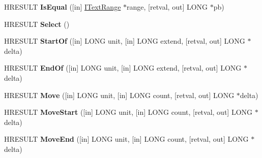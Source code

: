 \begin{DoxyCompactItemize}
\item 
\mbox{\label{interfacetom_1_1_i_text_range_a7f5cc02ca9bb296fd8d975bc23747808}} 
H\+R\+E\+S\+U\+LT {\bfseries Is\+Equal} (\mbox{[}in\mbox{]} \hyperlink{interfacetom_1_1_i_text_range}{I\+Text\+Range} $\ast$range, \mbox{[}retval, out\mbox{]} L\+O\+NG $\ast$pb)
\item 
\mbox{\label{interfacetom_1_1_i_text_range_a90cfe754f8611b5df1ead1839663bc9d}} 
H\+R\+E\+S\+U\+LT {\bfseries Select} ()
\item 
\mbox{\label{interfacetom_1_1_i_text_range_a60ae9696ffbcc0adf2b24377504314dc}} 
H\+R\+E\+S\+U\+LT {\bfseries Start\+Of} (\mbox{[}in\mbox{]} L\+O\+NG unit, \mbox{[}in\mbox{]} L\+O\+NG extend, \mbox{[}retval, out\mbox{]} L\+O\+NG $\ast$delta)
\item 
\mbox{\label{interfacetom_1_1_i_text_range_abeef363ffc7ae78aeec11357975a249b}} 
H\+R\+E\+S\+U\+LT {\bfseries End\+Of} (\mbox{[}in\mbox{]} L\+O\+NG unit, \mbox{[}in\mbox{]} L\+O\+NG extend, \mbox{[}retval, out\mbox{]} L\+O\+NG $\ast$delta)
\item 
\mbox{\label{interfacetom_1_1_i_text_range_abd5b14391159cd4bb90e7af440c14c0f}} 
H\+R\+E\+S\+U\+LT {\bfseries Move} (\mbox{[}in\mbox{]} L\+O\+NG unit, \mbox{[}in\mbox{]} L\+O\+NG count, \mbox{[}retval, out\mbox{]} L\+O\+NG $\ast$delta)
\item 
\mbox{\label{interfacetom_1_1_i_text_range_ab06a7c82c4cc6b824aab381e1ef57333}} 
H\+R\+E\+S\+U\+LT {\bfseries Move\+Start} (\mbox{[}in\mbox{]} L\+O\+NG unit, \mbox{[}in\mbox{]} L\+O\+NG count, \mbox{[}retval, out\mbox{]} L\+O\+NG $\ast$delta)
\item 
\mbox{\label{interfacetom_1_1_i_text_range_a4eb26d93d5b29ecf02de8bb73e998268}} 
H\+R\+E\+S\+U\+LT {\bfseries Move\+End} (\mbox{[}in\mbox{]} L\+O\+NG unit, \mbox{[}in\mbox{]} L\+O\+NG count, \mbox{[}retval, out\mbox{]} L\+O\+NG $\ast$delta)
\item 
\mbox{\label{interfacetom_1_1_i_text_range_a43010729c37d5157ada8a0a0f975d6fa}} 

\end{DoxyCompactItemize}
